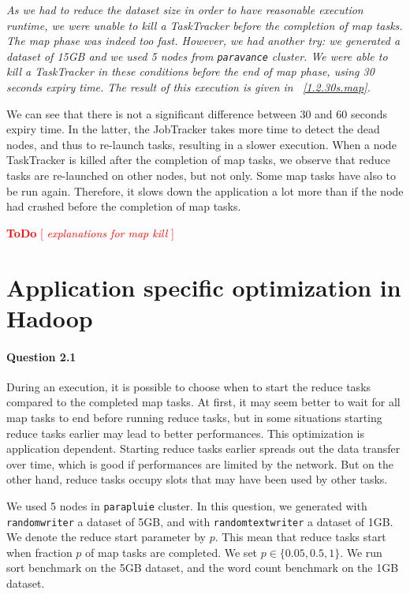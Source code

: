 \documentclass[a4paper]{article}
\newcommand{\todo}[1]{\textcolor{red}{\textbf{ToDo} [ \emph{#1} ]}}
\begin{document}
\textit{As we had to reduce the dataset size in order to have reasonable execution runtime,
we were unable to kill a TaskTracker before the completion of map tasks.
The map phase was indeed too fast.
However, we had another try: we generated a dataset of 15GB and we used 5 nodes from \texttt{paravance} cluster.
We were able to kill a TaskTracker in these conditions before the end of map phase, using 30 seconds expiry time.
The result of this execution is given in \figurename~\ref{1.2.30s.map}.}

We can see that there is not a significant difference between 30 and 60 seconds expiry time.
In the latter, the JobTracker takes more time to detect the dead nodes, and thus to re-launch tasks, resulting in a slower execution.
When a node TaskTracker is killed after the completion of map tasks,
we observe that reduce tasks are re-launched on other nodes, but not only.
Some map tasks have also to be run again.
Therefore, it slows down the application a lot more than if the node had crashed before the completion of map tasks.

\todo{ explanations for map kill }


\section{Application specific optimization in Hadoop}

\paragraph{Question 2.1}

During an execution, it is possible to choose when to start the reduce tasks compared to the completed map tasks.
At first, it may seem better to wait for all map tasks to end before running reduce tasks,
but in some situations starting reduce tasks earlier may lead to better performances.
This optimization is application dependent.
Starting reduce tasks earlier spreads out the data transfer over time, which is good if performances are limited by the network.
But on the other hand, reduce tasks occupy slots that may have been used by other tasks.

We used 5 nodes in \texttt{parapluie} cluster.
In this question, we generated with \texttt{randomwriter} a dataset of 5GB, and with \texttt{randomtextwriter} a dataset of 1GB.
We denote the reduce start parameter by $p$.
This mean that reduce tasks start when fraction $p$ of map tasks are completed.
We set $p \in \lbrace 0.05, 0.5, 1 \rbrace$.
We run sort benchmark on the 5GB dataset, and the word count benchmark on the 1GB dataset.
\end{document}
